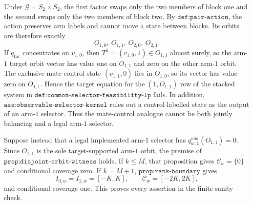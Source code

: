Under \(\mathcal G=S_2\times S_2\), the first factor swaps only the two members of block one and the second swaps only the two members of block two. By \(\texttt{def:pair-action}\), the action preserves arm labels and cannot move a state between blocks. Its orbits are therefore exactly
\[O_{1,0},\ O_{1,1},\ O_{2,0},\ O_{2,1}.\]
If \(q_{\mathrm{tar}}\) concentrates on \(v_{1,0}\), then \(T^1=(v_{1,0},1)\in O_{1,1}\) almost surely, so the arm-\(1\) target orbit vector has value one on \(O_{1,1}\) and zero on the other arm-\(1\) orbit. The exclusive mate-control state \((v_{1,1},0)\) lies in \(O_{1,0}\), so its vector has value zero on \(O_{1,1}\). Hence the target equation for the \((1,O_{1,1})\) row of the stacked system in \(\texttt{def:common-selector-feasibility-lp}\) fails. In addition, \(\texttt{ass:observable-selector-kernel}\) rules out a control-labelled state as the output of an arm-\(1\) selector. Thus the mate-control analogue cannot be both jointly balancing and a legal arm-\(1\) selector.

Suppose instead that a legal implemented arm-\(1\) selector has \(q^{\mathrm{obs}}_{w,1}(O_{1,1})=0\). Since \(O_{1,1}\) is the sole target-supported arm-\(1\) orbit, the premise of \(\texttt{prop:disjoint-orbit-witness}\) holds. If \(k\le M\), that proposition gives \(\mathcal C_w=\{0\}\) and conditional coverage zero. If \(k=M+1\), \(\texttt{prop:rank-boundary}\) gives
\[I_{0,w}=I_{1,w}=[-K,K],\qquad \mathcal C_w=[-2K,2K],\]
and conditional coverage one. This proves every assertion in the finite sanity check.